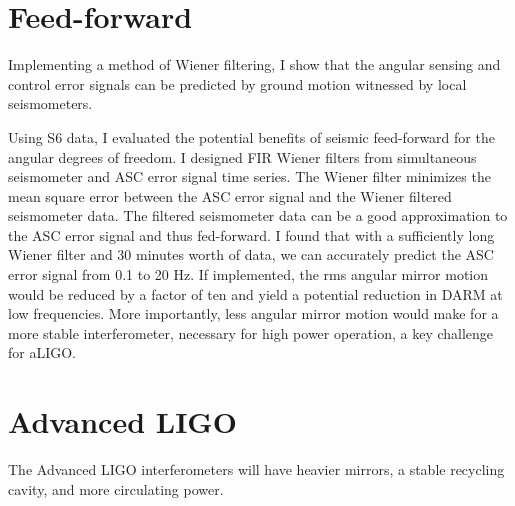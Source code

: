 \section{Feed-forward}
Implementing a method of Wiener ﬁltering, I show that the angular
sensing and control error signals can be predicted by ground motion
witnessed by local seismometers.

Using S6 data, I evaluated the potential benefits of seismic
feed-forward for the angular degrees of freedom. I designed FIR Wiener
filters from simultaneous seismometer and ASC error signal time
series. The Wiener filter minimizes the mean square error between the
ASC error signal and the Wiener filtered seismometer data. The
filtered seismometer data can be a good approximation to the ASC error
signal and thus fed-forward. I found that with a sufficiently long
Wiener filter and 30 minutes worth of data, we can accurately predict
the ASC error signal from 0.1 to 20 Hz. If implemented, the rms
angular mirror motion would be reduced by a factor of ten and yield a
potential reduction in DARM at low frequencies. More importantly, less
angular mirror motion would make for a more stable interferometer,
necessary for high power operation, a key challenge for aLIGO.


\section{Advanced LIGO}
The Advanced LIGO interferometers will have heavier mirrors, a stable
recycling cavity, and more circulating power. 